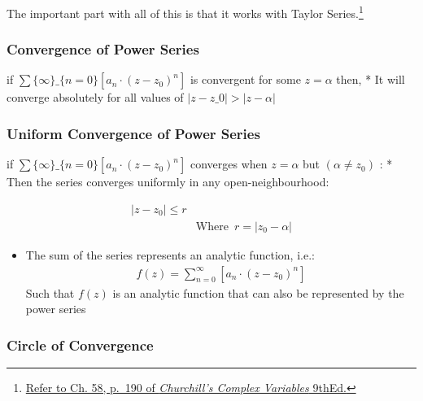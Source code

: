 \documentclass[class=article, crop=false]{standalone}
\begin{document}
The important part with all of this is that it works with Taylor
Series.\footnote{\href{https://www.dropbox.com/s/z4t4aebk15iyuc8/Proof\%20of\%20Taylor\%20series.pdf?dl=0}{Refer
  to Ch. 58, p.~190 of \emph{Churchill's Complex Variables} 9thEd.}}

\hypertarget{convergence-of-power-series}{%
\subsubsection{Convergence of Power
Series}\label{convergence-of-power-series}}

if \(\sum\{\infty\}\_\{n= 0\}
\left[ a_n\cdot \left( z- z_0 \right)^n  \right] \) is convergent for
some \(z= \alpha\) then, * It will converge absolutely for all values of
\( \left\rvert z- z\_0 \right\rvert > \left\rvert
z- \alpha \right\rvert \)

\hypertarget{uniform-convergence-of-power-series}{%
\subsubsection{Uniform Convergence of Power
Series}\label{uniform-convergence-of-power-series}}

if \(\sum\{\infty\}\_\{n= 0\}
\left[ a_n\cdot \left( z- z_0 \right) ^n \right] \) converges when
\(z = \alpha\) but \(\left( \alpha \neq z_0 \right)\)  : * Then the
series converges uniformly in any open-neighbourhood:

  \begin{align*}
        \left| z- z_0 \right| \leq r&\\
&        \text{Where} \enspace r =     \left| z_0 - \alpha \right|
  \end{align*}

\begin{itemize}
\item
  The sum of the series represents an analytic function, i.e.:
  \begin{align*}
  f\left( z \right) = \sum^{\infty}_{n= 0}   \left[ a_n\cdot \left( z- z_0 \right) ^n \right]
  \end{align*}
 Such that \(f\left( z \right) \) is an analytic function that can
  also be represented by the power series
\end{itemize}

\hypertarget{circle-of-convergence}{%
\subsubsection{Circle of Convergence}\label{circle-of-convergence}}
\end{document}
